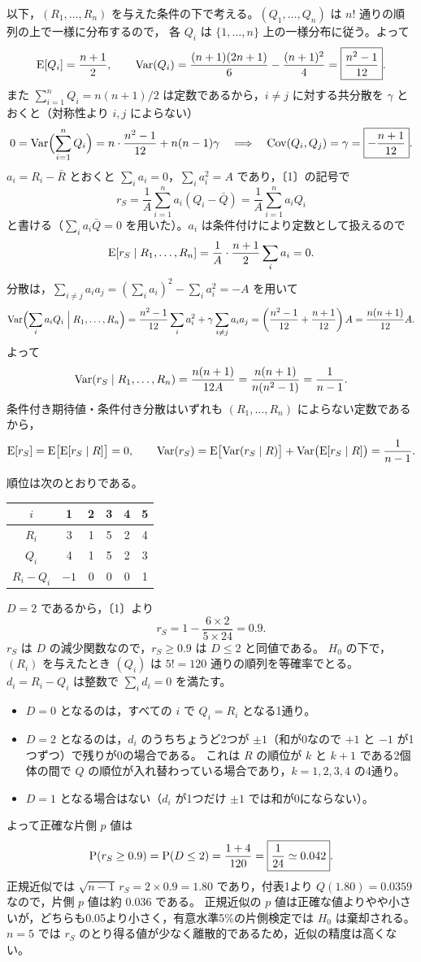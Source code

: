 \documentclass[a4paper,11pt]{ltjsarticle}
\begin{document}
以下，$(R_1,\ldots,R_n)$ を与えた条件の下で考える。$(Q_1,\ldots,Q_n)$ は $n!$ 通りの順列の上で一様に分布するので，
各 $Q_i$ は $\{1,\ldots,n\}$ 上の一様分布に従う。よって
\[
\operatorname{E}[Q_i]=\frac{n+1}2,\qquad
\operatorname{Var}(Q_i)=\frac{(n+1)(2n+1)}6-\frac{(n+1)^2}4=\boxed{\frac{n^2-1}{12}}.
\]
また $\sum_{i=1}^nQ_i=n(n+1)/2$ は定数であるから，$i\ne j$ に対する共分散を $\gamma$ とおくと（対称性より $i,j$ によらない）
\[
0=\operatorname{Var}\Bigl(\sum_{i=1}^nQ_i\Bigr)=n\cdot\frac{n^2-1}{12}+n(n-1)\gamma
\quad\Longrightarrow\quad
\operatorname{Cov}(Q_i,Q_j)=\gamma=\boxed{-\frac{n+1}{12}}.
\]
$a_i=R_i-\bar R$ とおくと $\sum_ia_i=0$，$\sum_ia_i^2=A$ であり，〔1〕の記号で
\[
r_S=\frac1A\sum_{i=1}^na_i(Q_i-\bar Q)=\frac1A\sum_{i=1}^na_iQ_i
\]
と書ける（$\sum_ia_i\bar Q=0$ を用いた）。$a_i$ は条件付けにより定数として扱えるので
\[
\operatorname{E}[r_S\mid R_1,\ldots,R_n]=\frac1A\cdot\frac{n+1}2\sum_ia_i=0 .
\]
分散は，$\sum_{i\ne j}a_ia_j=(\sum_ia_i)^2-\sum_ia_i^2=-A$ を用いて
\[
\operatorname{Var}\Bigl(\sum_ia_iQ_i\Bigm| R_1,\ldots,R_n\Bigr)=\frac{n^2-1}{12}\sum_ia_i^2+\gamma\sum_{i\ne j}a_ia_j
=\left(\frac{n^2-1}{12}+\frac{n+1}{12}\right)A=\frac{n(n+1)}{12}A .
\]
よって
\[
\operatorname{Var}(r_S\mid R_1,\ldots,R_n)=\frac{n(n+1)}{12A}=\frac{n(n+1)}{n(n^2-1)}=\frac1{n-1}.
\]
条件付き期待値・条件付き分散はいずれも $(R_1,\ldots,R_n)$ によらない定数であるから，
\[
\operatorname{E}[r_S]=\operatorname{E}\bigl[\operatorname{E}[r_S\mid R]\bigr]=0,\qquad
\operatorname{Var}(r_S)=\operatorname{E}\bigl[\operatorname{Var}(r_S\mid R)\bigr]+\operatorname{Var}\bigl(\operatorname{E}[r_S\mid R]\bigr)=\frac1{n-1}.
\]

順位は次のとおりである。
\begin{center}
\begin{tabular}{cccccc}
\toprule
$i$ & 1 & 2 & 3 & 4 & 5\\
\midrule
$R_i$ & 3 & 1 & 5 & 2 & 4\\
$Q_i$ & 4 & 1 & 5 & 2 & 3\\
$R_i-Q_i$ & $-1$ & 0 & 0 & 0 & 1\\
\bottomrule
\end{tabular}
\end{center}
$D=2$ であるから，〔1〕より
\[
r_S=1-\frac{6\times2}{5\times24}=\boxed{0.9}.
\]
$r_S$ は $D$ の減少関数なので，$r_S\ge0.9$ は $D\le2$ と同値である。
$H_0$ の下で，$(R_i)$ を与えたとき $(Q_i)$ は $5!=120$ 通りの順列を等確率でとる。
$d_i=R_i-Q_i$ は整数で $\sum_id_i=0$ を満たす。
\begin{itemize}
\item $D=0$ となるのは，すべての $i$ で $Q_i=R_i$ となる1通り。
\item $D=2$ となるのは，$d_i$ のうちちょうど2つが $\pm1$（和が0なので $+1$ と $-1$ が1つずつ）で残りが0の場合である。
これは $R$ の順位が $k$ と $k+1$ である2個体の間で $Q$ の順位が入れ替わっている場合であり，$k=1,2,3,4$ の4通り。
\item $D=1$ となる場合はない（$d_i$ が1つだけ $\pm1$ では和が0にならない）。
\end{itemize}
よって正確な片側 $p$ 値は
\[
\operatorname{P}(r_S\ge0.9)=\operatorname{P}(D\le2)=\frac{1+4}{120}=\boxed{\frac1{24}\simeq0.042}.
\]
正規近似では $\sqrt{n-1}\,r_S=2\times0.9=1.80$ であり，付表1より $Q(1.80)=0.0359$ なので，片側 $p$ 値は約 $\boxed{0.036}$ である。
正規近似の $p$ 値は正確な値よりやや小さいが，どちらも0.05より小さく，有意水準5\%の片側検定では $H_0$ は棄却される。
$n=5$ では $r_S$ のとり得る値が少なく離散的であるため，近似の精度は高くない。
\end{document}
